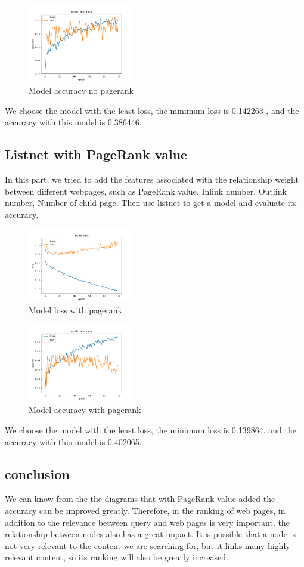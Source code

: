\documentclass{acmtog} %
\begin{document}
\begin{figure}[htbp]
    \centering
    \includegraphics[width = 1.8in]{9.png}
    \caption{Model accuracy no pagerank}
\end{figure}
We choose the model with the least loss, the minimum loss is 0.142263 , and the accuracy with this model is 0.386446.

\subsection{Listnet with PageRank value}
In this part, we tried to add the features associated with the relationship weight between different webpages, such as PageRank value, Inlink number, Outlink number, Number of child page. Then use listnet to get a model and evaluate its accuracy.
\begin{figure}[htbp]
    \centering
    \includegraphics[width = 1.8in]{10.png}
    \caption{Model loss with pagerank}
\end{figure}

\begin{figure}[htbp]
    \centering
    \includegraphics[width = 1.8in]{11.png}
    \caption{Model accuracy with pagerank}
\end{figure}
We choose the model with the least loss, the minimum loss is 0.139864, and the accuracy with this model is 0.402065.

\subsection{conclusion}
We can know from the the diagrams that with PageRank value added the accuracy can be improved greatly. Therefore, in the ranking of web pages, in addition to the relevance between query and web pages is very important, the relationship between nodes also has a great impact. It is possible that a node is not very relevant to the content we are searching for, but it links many highly relevant content, so its ranking will also be greatly increased.
\end{document}
